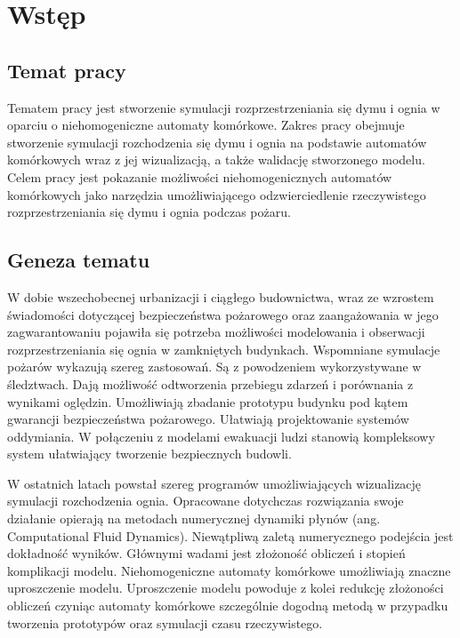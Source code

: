 \chapter{Wstęp}
\label{cha:wstep}

\section{Temat pracy} %

Tematem pracy jest stworzenie symulacji rozprzestrzeniania się dymu i ognia 
w oparciu o niehomogeniczne automaty komórkowe. Zakres pracy obejmuje stworzenie symulacji rozchodzenia się dymu i ognia na podstawie automatów komórkowych wraz z jej wizualizacją, a także walidację stworzonego modelu. 
Celem pracy jest pokazanie możliwości niehomogenicznych automatów komórkowych jako narzędzia umożliwiającego 
odzwierciedlenie rzeczywistego rozprzestrzeniania się dymu i ognia podczas pożaru. 

\section {Geneza tematu} %

W dobie wszechobecnej urbanizacji i ciągłego budownictwa, wraz ze wzrostem świadomości dotyczącej bezpieczeństwa
pożarowego oraz zaangażowania w jego zagwarantowaniu pojawiła się potrzeba możliwości modelowania i obserwacji rozprzestrzeniania się ognia w zamkniętych budynkach.
Wspomniane symulacje pożarów wykazują szereg zastosowań. Są z powodzeniem wykorzystywane w śledztwach. Dają możliwość odtworzenia przebiegu zdarzeń i porównania z wynikami oględzin. Umożliwiają
zbadanie prototypu budynku pod kątem gwarancji bezpieczeństwa pożarowego. 
Ułatwiają projektowanie systemów oddymiania. W połączeniu z modelami ewakuacji ludzi
stanowią kompleksowy system ułatwiający tworzenie bezpiecznych budowli.

W ostatnich latach powstał szereg programów umożliwiających wizualizację symulacji rozchodzenia ognia. Opracowane dotychczas rozwiązania swoje działanie 
opierają na metodach numerycznej dynamiki płynów (ang. Computational Fluid Dynamics). Niewątpliwą zaletą numerycznego podejścia jest dokładność wyników. 
Głównymi wadami jest złożoność obliczeń i stopień komplikacji modelu. 
Niehomogeniczne automaty komórkowe umożliwiają znaczne uproszczenie modelu. Uproszczenie modelu powoduje z kolei redukcję złożoności
obliczeń czyniąc automaty komórkowe szczególnie dogodną metodą w przypadku tworzenia prototypów oraz symulacji czasu rzeczywistego.

